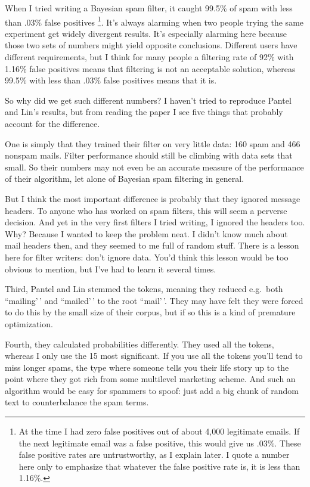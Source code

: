 \documentclass[12pt]{book}
\begin{document}
When I tried writing a Bayesian spam filter, it caught 99.5\% of spam
with less than .03\% false positives \footnote{At the time I had zero false positives out of about 4,000
legitimate emails. If the next legitimate email was a false positive,
this would give us .03\%. These false positive rates are untrustworthy,
as I explain later. I quote a number here only to emphasize that
whatever the false positive rate is, it is less than 1.16\%.}. It's always alarming when
two people trying the same experiment get widely divergent results. It's
especially alarming here because those two sets of numbers might yield
opposite conclusions. Different users have different requirements, but I
think for many people a filtering rate of 92\% with 1.16\% false
positives means that filtering is not an acceptable solution, whereas
99.5\% with less than .03\% false positives means that it is.

So why did we get such different numbers? I haven't tried to reproduce
Pantel and Lin's results, but from reading the paper I see five things
that probably account for the difference.

One is simply that they trained their filter on very little data: 160
spam and 466 nonspam mails. Filter performance should still be climbing
with data sets that small. So their numbers may not even be an accurate
measure of the performance of their algorithm, let alone of Bayesian
spam filtering in general.

But I think the most important difference is probably that they ignored
message headers. To anyone who has worked on spam filters, this will
seem a perverse decision. And yet in the very first filters I tried
writing, I ignored the headers too. Why? Because I wanted to keep the
problem neat. I didn't know much about mail headers then, and they
seemed to me full of random stuff. There is a lesson here for filter
writers: don't ignore data. You'd think this lesson would be too obvious
to mention, but I've had to learn it several times.

Third, Pantel and Lin stemmed the tokens, meaning they reduced e.g.~both
``mailing'\,' and ``mailed'\,' to the root ``mail'\,'. They may have
felt they were forced to do this by the small size of their corpus, but
if so this is a kind of premature optimization.

Fourth, they calculated probabilities differently. They used all the
tokens, whereas I only use the 15 most significant. If you use all the
tokens you'll tend to miss longer spams, the type where someone tells
you their life story up to the point where they got rich from some
multilevel marketing scheme. And such an algorithm would be easy for
spammers to spoof: just add a big chunk of random text to counterbalance
the spam terms.
\end{document}
